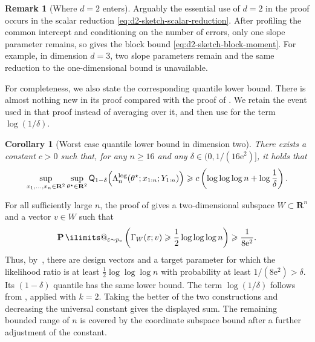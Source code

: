 \documentclass[11pt, letterpaper, hidelinks]{article}
\makeatletter
\renewcommand{\proofname}{\textit{\textbf{Proof}}}
\renewenvironment{proof}[1][\proofname]{\par\pushQED{\qed}\normalfont \topsep6\p@\@plus6\p@\relax\trivlist\item[\hskip\labelsep#1\@addpunct{}]\ignorespaces}{\popQED\endtrivlist\@endpefalse}
\newcommand{\proofsketchname}{\textit{\textbf{Proof sketch}}}
\newenvironment{proofsketch}
  {\begin{proof}[\proofsketchname]}
  {\end{proof}}
\newcommand{\R}{\mathbf R}
\newcommand{\e}{\mathrm{e}}
\newcommand{\1}{\mathbf 1}
\newcommand{\eps}{\varepsilon}
\renewcommand{\geq}{\geqslant}
\renewcommand{\P}{\operatorname*{\mathbf{P}}\ilimits@}
\theoremstyle{plain}
\newtheorem{corollary}{Corollary}[section]
\theoremstyle{definition}
\newtheorem{remark}{Remark}[section]
\newcommand{\thetastar}{\theta^\star}
\newcommand{\Quant}[1]{\mathsf{Q}_{#1}}
\makeatother
\begin{document}
\begin{remark}[Where $d = 2$ enters]
Arguably the essential use of $d=2$ in the proof occurs in the scalar reduction
\eqref{eq:d2-sketch-scalar-reduction}.  After profiling the common intercept
and conditioning on the number of errors, only one slope parameter remains,
so  gives the block bound
\eqref{eq:d2-sketch-block-moment}.  For example, in dimension $d = 3$, two slope parameters
remain and the same reduction to the one-dimensional bound is unavailable.
\end{remark}

For completeness, we also state the corresponding quantile lower bound.
There is almost nothing new in its proof compared with the proof of
.  We retain the event used in that proof
instead of averaging over it, and then use
 for the term $\log(1/\delta)$.

\begin{corollary}[Worst case quantile lower bound in dimension two]
\label{cor:d2-logloglog-quantile-lower}
There exists a constant $c>0$ such that, for any $n\geq16$ and any
$\delta\in(0,1/(16\e^2)]$, it holds that
\[
\sup_{x_1,\ldots,x_n\in\R^2}
\sup_{\thetastar\in\R^2}
\Quant{1-\delta}
\Bigl(
\Lambda_n^{\operatorname{log}}
(\thetastar;x_{1:n};Y_{1:n})
\Bigr)
\geq
c\left(
\log\log\log n+\log\frac{1}{\delta}
\right).
\]
\end{corollary}

\begin{proofsketch}
For all sufficiently large $n$, the proof of
 gives a two-dimensional subspace
$W\subset\R^n$ and a vector $v\in W$ such that
\[
\P_{\eps\sim p_v}\left(
\Gamma_W(\eps;v)\geq\frac12\log\log\log n
\right)
\geq\frac{1}{8\e^2}.
\]
Thus, by~, there are design vectors and
a target parameter for which the likelihood ratio is at least
$\tfrac12\log\log\log n$ with probability at least
$1/(8\e^2)>\delta$. Its $(1-\delta)$ quantile has the same lower bound. The
term $\log(1/\delta)$ follows from
, applied with $k=2$. Taking the better of the two
constructions and decreasing the universal constant gives the displayed sum. The remaining bounded range of $n$ is covered by the
coordinate subspace bound after a further adjustment of the constant.
\end{proofsketch}
\end{document}
